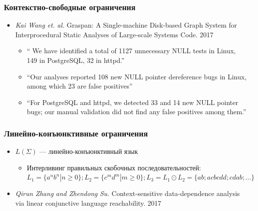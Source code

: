 \documentclass[xcolor=table,aspectratio=169]{beamer}
\begin{document}
\begin{frame}
  \transwipe[direction=90]
  \frametitle{Контекстно-свободные ограничения}

\begin{itemize} 
\item \emph{Kai Wang et. al.} Graspan: A Single-machine Disk-based Graph System for Interprocedural 
Static Analyses of Large-scale Systems Code. 2017
  
\begin{itemize} 
   \item `` We have identified a total of 1127 unnecessary NULL tests in Linux, 149 in PostgreSQL, 
   32 in httpd.''
   \item ``Our analyses reported 108 new NULL pointer dereference bugs in Linux, among which 23 are false positives''
   \item ``For PostgreSQL and httpd, we detected 33 and 14 new NULL pointer bugs; our manual 
   validation did not find any false positives among them.''
\end{itemize}

\end{itemize}

\end{frame}

\begin{frame}
  \transwipe[direction=90]
  \frametitle{Линейно-конъюнктивные ограничения}

\begin{itemize} 
  \item $L(\Sigma)$ --- линейно-конъюнктивный язык
    \begin{itemize} 
      \item Интерливинг правильных скобочных последовательностей: $L_1 = \{a^n b^n | n \geq 0\}; L_2 = \{c^m d^m | m \geq 0\}; L_3 = L_1 \odot L_2 = \{a b; a c b c d d; c d a b;  \dots\}$
    \end{itemize}

  \item \emph{Qirun Zhang and Zhendong Su.} Context-sensitive data-dependence analysis via linear conjunctive language reachability. 2017
  
\end{itemize}

\end{frame}
\end{document}
